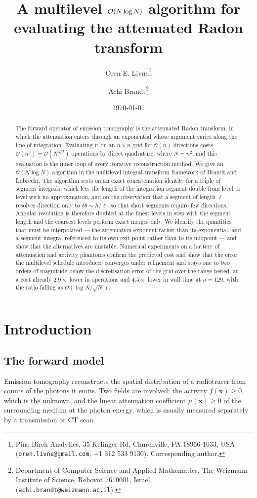 \documentclass[11pt]{article}
\title{A multilevel $\bigO(N\log N)$ algorithm for evaluating the
attenuated Radon transform}
\author{%
  Oren E. Livne\thanks{Pine Birch Analytics, 35 Kelinger Rd, Churchville,
    PA 18966-1033, USA
    (\texttt{oren.livne@gmail.com}, +1 312 533 9130). Corresponding author.}
  \and
  Achi Brandt\thanks{Department of Computer Science and Applied Mathematics,
    The Weizmann Institute of Science, Rehovot 7610001, Israel
    (\texttt{achi.brandt@weizmann.ac.il}).}
}
\date{\today}
\newcommand{\bx}{\mathbf{x}}
\newcommand{\bigO}{\mathcal{O}}
\begin{document}
\maketitle

\begin{abstract}
The forward operator of emission tomography is the attenuated Radon transform,
in which the attenuation enters through an exponential whose argument varies
along the line of integration. Evaluating it on an $n\times n$ grid for
$\bigO(n)$ directions costs $\bigO(n^3)=\bigO(N^{3/2})$ operations by direct
quadrature, where $N=n^2$, and this evaluation is the inner loop of every
iterative reconstruction method. We give an $\bigO(N\log N)$ algorithm in the
multilevel integral-transform framework of Brandt and Lubrecht. The algorithm
rests on an exact concatenation identity for a triple of segment integrals,
which lets the length of the integration segment double from level to level
with no approximation, and on the observation that a segment of length $\ell$
resolves direction only to $\delta\theta\sim h/\ell$, so that short segments
require few directions. Angular resolution is therefore doubled at the finest
levels in step with the segment length and the coarsest levels perform exact
merges only. We identify the quantities that must be interpolated --- the
attenuation exponent rather than its exponential, and a segment integral
referenced to its own exit point rather than to its midpoint --- and show that
the alternatives are unstable. Numerical experiments on a battery of
attenuation and activity phantoms confirm the predicted cost and show that the
error the multilevel schedule introduces converges under refinement and stays
one to two orders of magnitude below the discretisation error of the grid over
the range tested, at a cost already $2.9\times$ lower in operations and
$4.5\times$ lower in wall time at $n=129$, with the ratio falling as
$\bigO(\log N/\sqrt{N})$.
\end{abstract}

\section{Introduction}
\label{sec:intro}

\subsection{The forward model}

Emission tomography reconstructs the spatial distribution of a radiotracer
from counts of the photons it emits. Two fields are involved: the activity
$f(\bx)\ge 0$, which is the unknown, and the linear attenuation coefficient
$\mu(\bx)\ge 0$ of the surrounding medium at the photon energy, which is
usually measured separately by a transmission or CT scan.
\end{document}
